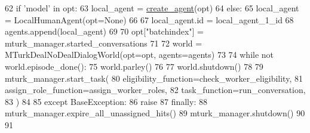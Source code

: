\begin{DoxyCode}
62                 \textcolor{keywordflow}{if} \textcolor{stringliteral}{'model'} \textcolor{keywordflow}{in} opt:
63                     local\_agent = \hyperlink{namespaceparlai_1_1core_1_1agents_ad0d54074d4bcc148bb415ab5515a53b5}{create\_agent}(opt)
64                 \textcolor{keywordflow}{else}:
65                     local\_agent = LocalHumanAgent(opt=\textcolor{keywordtype}{None})
66 
67                 local\_agent.id = local\_agent\_1\_id
68                 agents.append(local\_agent)
69 
70             opt[\textcolor{stringliteral}{"batchindex"}] = mturk\_manager.started\_conversations
71 
72             world = MTurkDealNoDealDialogWorld(opt=opt, agents=agents)
73 
74             \textcolor{keywordflow}{while} \textcolor{keywordflow}{not} world.episode\_done():
75                 world.parley()
76 
77             world.shutdown()
78 
79         mturk\_manager.start\_task(
80             eligibility\_function=check\_worker\_eligibility,
81             assign\_role\_function=assign\_worker\_roles,
82             task\_function=run\_conversation,
83         )
84 
85     \textcolor{keywordflow}{except} BaseException:
86         \textcolor{keywordflow}{raise}
87     \textcolor{keywordflow}{finally}:
88         mturk\_manager.expire\_all\_unassigned\_hits()
89         mturk\_manager.shutdown()
90 
91 
\end{DoxyCode}
